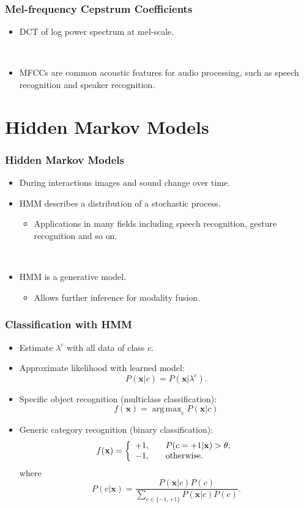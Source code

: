 \documentclass[t]{beamer}
\DeclareMathOperator*{\argmax}{arg\,max}
\begin{document}
\begin{frame}
  \frametitle{Mel-frequency Cepstrum Coefficients}

  \begin{itemize}
    \item DCT of log power spectrum at mel-scale.

      ~
    \item MFCCs are common acoustic features for audio processing, such as speech recognition and speaker recognition.
  \end{itemize}
\end{frame}

\section{Hidden Markov Models}
\begin{frame}
  \frametitle{Hidden Markov Models}

  \begin{itemize}
    \item During interactions images and sound change over time.
    \item HMM describes a distribution of a stochastic process.
      \begin{itemize}
        \item Applications in many fields including speech recognition, gesture recognition and so on. 
      \end{itemize}
      ~

    \item HMM is a generative model.
      \begin{itemize}
        \item Allows further inference for modality fusion. 
      \end{itemize}
  \end{itemize}
\end{frame}

\begin{frame}
  \frametitle{Classification with HMM}

  \begin{itemize}
    \item Estimate $\lambda^c$ with all data of class $c$.

    \item Approximate likelihood with learned model:
      \[ P(\mathbf{x}|c) = P(\mathbf{x}|\lambda^c) . \]
    \item Specific object recognition (multiclass classification):
      \[ f(\mathbf{x}) = \argmax_{c} P(\mathbf{x}|c) \]
    \item Generic category recognition (binary classification):
      \[ 
        f(\mathbf{x}) = \left\{
          \begin{array}{l l}
            +1, & \quad P(c=+1|\mathbf{x}) > \theta; \\
            -1, & \quad \text{otherwise.}
          \end{array} \right.
      \]
        where
      \[ P(c|\mathbf{x}) = \frac{P(\mathbf{x}|c)P(c)}{\sum_{c \in \{-1,+1\}} P(\mathbf{x}|c)P(c)} . \]
  \end{itemize}
\end{frame}
\end{document}
